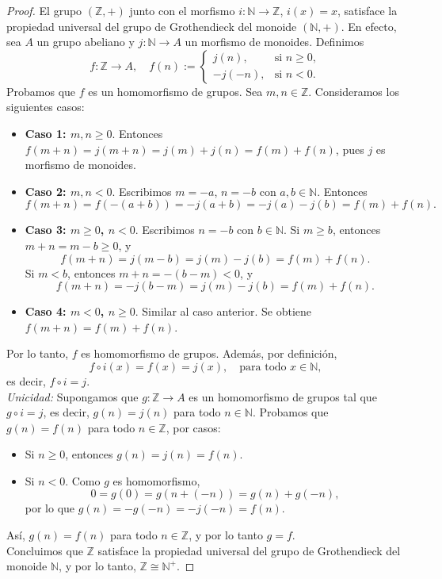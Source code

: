 \begin{proof}
	El grupo \((\mathbb{Z},+)\) junto con el morfismo \(i : \mathbb{N} \to \mathbb{Z}\), \(i(x) = x\), satisface la propiedad universal del grupo de Grothendieck del monoide \((\mathbb{N},+)\). En efecto, sea \(A\) un grupo abeliano y \(j : \mathbb{N} \to A\) un morfismo de monoides. Definimos
	\[
	f : \mathbb{Z} \to A,\quad
	f(n) :=
	\begin{cases}
		j(n), & \text{si } n \geq 0,\\
		-j(-n), & \text{si } n < 0.
	\end{cases}
	\] Probamos que \(f\) es un homomorfismo de grupos. Sea \(m,n \in \mathbb{Z}\). Consideramos los siguientes casos:
	
	\begin{itemize}
		\item \textbf{Caso 1: \(m,n \geq 0\)}. Entonces \(f(m+n) = j(m+n) = j(m) + j(n) = f(m) + f(n)\), pues \(j\) es morfismo de monoides.
		
		\item \textbf{Caso 2: \(m,n < 0\)}. Escribimos \(m = -a\), \(n = -b\) con \(a,b \in \mathbb{N}\). Entonces
		\[
		f(m+n) = f(-(a+b)) = -j(a+b) = -j(a) - j(b) = f(m) + f(n).
		\]
		
		\item \textbf{Caso 3: \(m \geq 0\), \(n < 0\)}. Escribimos \(n = -b\) con \(b \in \mathbb{N}\). Si \(m \geq b\), entonces \(m + n = m - b \geq 0\), y
		\[
		f(m + n) = j(m - b) = j(m) - j(b) = f(m) + f(n).
		\]
		Si \(m < b\), entonces \(m + n = -(b - m) < 0\), y
		\[
		f(m + n) = -j(b - m) = j(m) - j(b) = f(m) + f(n).
		\]
		
		\item \textbf{Caso 4: \(m < 0\), \(n \geq 0\)}. Similar al caso anterior. Se obtiene \(f(m+n) = f(m) + f(n)\).
	\end{itemize}
	
Por lo tanto, \(f\) es homomorfismo de grupos. Además, por definición,
\[
f \circ i(x) = f(x) = j(x),\quad \text{para todo } x \in \mathbb{N},
\]
es decir, \(f \circ i = j\).\\

\noindent \textit{Unicidad:} Supongamos que \(g : \mathbb{Z} \to A\) es un homomorfismo de grupos tal que \(g \circ i = j\), es decir, \(g(n) = j(n)\) para todo \(n \in \mathbb{N}\). Probamos que \(g(n) = f(n)\) para todo \(n \in \mathbb{Z}\), por casos:

\begin{itemize}
	\item Si \(n \geq 0\), entonces \(g(n) = j(n) = f(n)\).
	
	\item Si \(n < 0\). Como \(g\) es homomorfismo,
	\[
	0 = g(0) = g(n +(-n)) = g(n) + g(-n),
	\]
	por lo que \(g(n) = -g(-n) = -j(-n) = f(n)\).
\end{itemize} Así, \(g(n) = f(n)\) para todo \(n \in \mathbb{Z}\), y por lo tanto \(g = f\).\\

\noindent Concluimos que \(\mathbb{Z}\) satisface la propiedad universal del grupo de Grothendieck del monoide \(\mathbb{N}\), y por lo tanto, \(\mathbb{Z} \cong \mathbb{N}^+\).
\end{proof}
